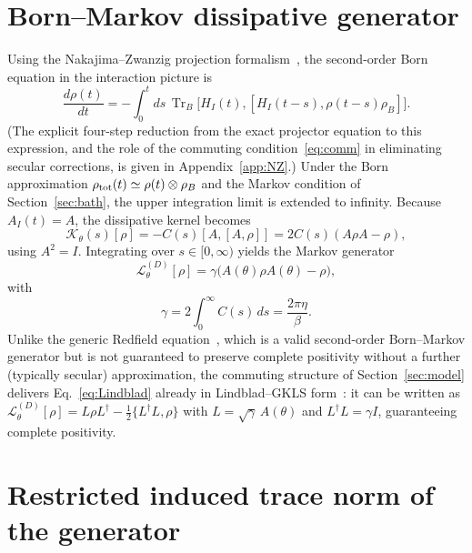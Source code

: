 \documentclass[aps,pra,reprint,superscriptaddress,nofootinbib,longbibliography]{revtex4-2}
\begin{document}
\section{Born--Markov dissipative generator}
\label{sec:generator}

Using the Nakajima--Zwanzig projection
formalism~\cite{nakajima1958,zwanzig1960}, the second-order Born
equation in the interaction picture is
\begin{equation}
\frac{d\rho(t)}{dt}
= -\int_0^t ds\, \operatorname{Tr}_B\bigl[H_I(t),[H_I(t-s),\rho(t-s)\rho_B]\bigr].
\label{eq:NZ}
\end{equation}
(The explicit four-step reduction from the exact projector equation to
this expression, and the role of the commuting
condition~\eqref{eq:comm} in eliminating secular corrections, is given
in Appendix~\ref{app:NZ}.) Under the Born approximation
$\rho_{\rm tot}(t)\simeq\rho(t)\otimes\rho_B$ and the Markov condition
of Section~\ref{sec:bath}, the upper integration limit is extended to
infinity. Because $A_I(t)=A$, the dissipative kernel becomes
\begin{equation}
\mathcal{K}_\theta(s)[\rho] = -C(s)[A,[A,\rho]] = 2C(s)(A\rho A-\rho),
\label{eq:kernel}
\end{equation}
using $A^2=I$. Integrating over $s\in[0,\infty)$ yields the Markov
generator
\begin{equation}
\boxed{\mathcal{L}^{(D)}_\theta[\rho] = \gamma\bigl(A(\theta)\rho A(\theta)-\rho\bigr)},
\label{eq:Lindblad}
\end{equation}
with
\begin{equation}
\gamma = 2\int_0^\infty C(s)\,ds = \frac{2\pi\eta}{\beta}.
\label{eq:gamma}
\end{equation}
Unlike the generic Redfield
equation~\cite{redfield1957theory}, which is a valid second-order
Born--Markov generator but is not guaranteed to preserve complete
positivity without a further (typically secular) approximation, the
commuting structure of Section~\ref{sec:model} delivers
Eq.~\eqref{eq:Lindblad} already in Lindblad--GKLS
form~\cite{lindblad1976generators,gorini1976completely}: it can be
written as
$\mathcal{L}^{(D)}_\theta[\rho] = L\rho L^\dagger -\tfrac12\{L^\dagger L,\rho\}$
with $L=\sqrt{\gamma}\,A(\theta)$ and $L^\dagger L=\gamma I$,
guaranteeing complete positivity.

\section{Restricted induced trace norm of the generator}
\label{sec:norm}
\end{document}
